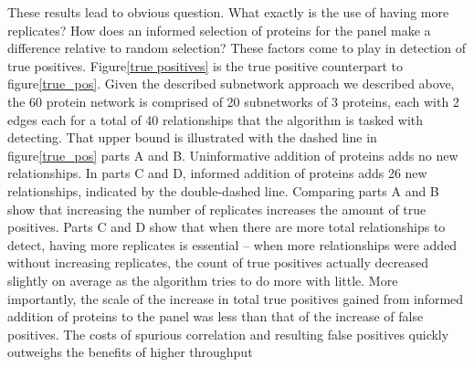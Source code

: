 \documentclass[journal=jacsat,manuscript=article]{achemso}
\def\added#1{{\color{blue} #1}}
\begin{document}
\added{These results lead to obvious question.  What exactly is the use of having more replicates? How does an informed selection of proteins for the panel make a difference relative to random selection?  These factors come to play in detection of true positives.  Figure\ref{true positives} is the true positive counterpart to figure\ref{true_pos}.  Given the described subnetwork approach we described above, the 60 protein network is comprised of 20 subnetworks of 3 proteins, each with 2 edges each for a total of 40 relationships that the algorithm is tasked with detecting.  That upper bound is illustrated with the dashed line in figure\ref{true_pos} parts A and B.  Uninformative addition of proteins adds no new relationships.  In parts C and D, informed addition of proteins adds 26 new relationships, indicated by the double-dashed line.  Comparing parts A and B show that increasing the number of replicates increases the amount of true positives.  Parts C and D show that when there are more total relationships to detect, having more replicates is essential -- when more relationships were added without increasing replicates, the count of true positives actually decreased slightly on average as the algorithm tries to do more with little.  More importantly, the scale of the increase in total true positives gained from informed addition of proteins to the panel was less than that of the increase of false positives.  The costs of spurious correlation and resulting false positives quickly outweighs the benefits of higher throughput}    
\end{document}
